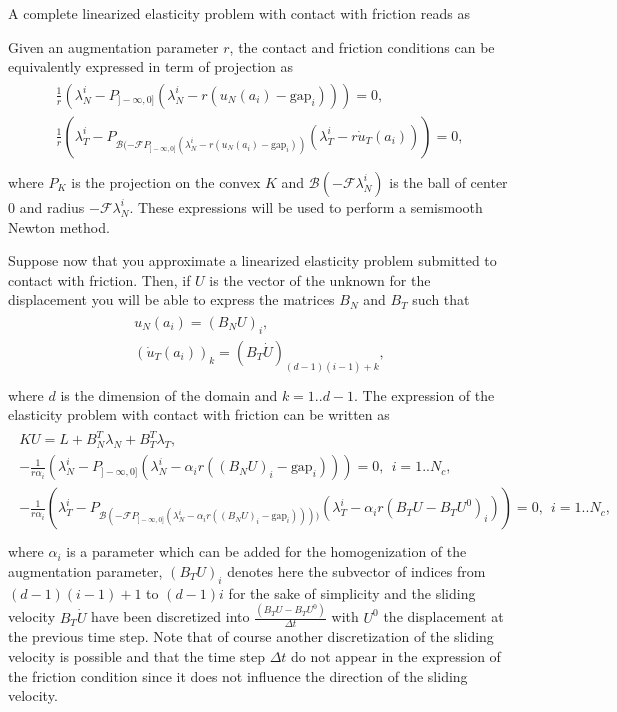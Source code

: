 \documentclass[a4paper,11pt,english]{sphinxmanual}
\begin{document}
A complete linearized elasticity problem with contact with friction reads as

Given an augmentation parameter \(r\), the contact and friction conditions can be equivalently expressed in term of projection as
\begin{align*}\!\begin{aligned}
\frac{1}{r}(\lambda_N^i - P_{]-\infty, 0]}(\lambda_N^i - r (u_N(a_i) - \text{gap}_i))) = 0,\\
\frac{1}{r}(\lambda_T^i - P_{{\mathscr B}(-{\mathscr F}P_{]-\infty, 0]}(\lambda_N^i - r(u_N(a_i) - \text{gap}_i))}(\lambda_T^i - r \dot{u}_T(a_i))) = 0,\\
\end{aligned}\end{align*}
where \(P_K\) is the projection on the convex \(K\) and \({\mathscr B}(-{\mathscr F}\lambda_N^i)\) is the ball of center \(0\) and radius \(-{\mathscr F}\lambda_N^i\).
These expressions will be used to perform a semi\sphinxhyphen{}smooth Newton method.

Suppose now that you approximate a linearized elasticity problem submitted to contact with friction. Then, if \(U\) is the vector of the unknown for the displacement you will be able to express the matrices \(B_N\) and \(B_T\) such that
\begin{align*}\!\begin{aligned}
u_N(a_i) = (B_N U)_i,\\
(\dot{u}_T(a_i))_k = (B_T \dot{U})_{(d-1)(i-1)+k},\\
\end{aligned}\end{align*}
where \(d\) is the dimension of the domain and \(k = 1..d-1\). The expression of the elasticity problem with contact with friction can be written as
\begin{align*}\!\begin{aligned}
K U = L + B_N^T \lambda_N + B_T^T \lambda_T,\\
-\frac{1}{r\alpha_i}(\lambda_N^i - P_{]-\infty, 0]}(\lambda_N^i - \alpha_i r ((B_N U)_i - \text{gap}_i))) = 0, ~~ i = 1..N_c,\\
-\frac{1}{r\alpha_i}(\lambda_T^i - P_{{\mathscr B}(-{\mathscr F}P_{]-\infty, 0]}(\lambda_N^i - \alpha_i r ((B_N U)_i - \text{gap}_i))))}(\lambda_T^i - \alpha_i r (B_T U - B_T U^{0})_i)) = 0, ~~ i = 1..N_c,\\
\end{aligned}\end{align*}
where \(\alpha_i\) is a parameter which can be added for the homogenization of the augmentation parameter, \((B_T U)_i\) denotes here the sub\sphinxhyphen{}vector of indices from \((d-1)(i-1)+1\) to \((d-1)i\) for the sake of simplicity and the sliding velocity \(B_T \dot{U}\) have been discretized into \(\frac{(B_T U - B_T U^{0})}{\Delta t}\) with \(U^{0}\) the displacement at the previous time step. Note that of course another discretization of the sliding velocity is possible and that the time step \(\Delta t\) do not appear in the expression of the friction condition since it does not influence the direction of the sliding velocity.
\end{document}
